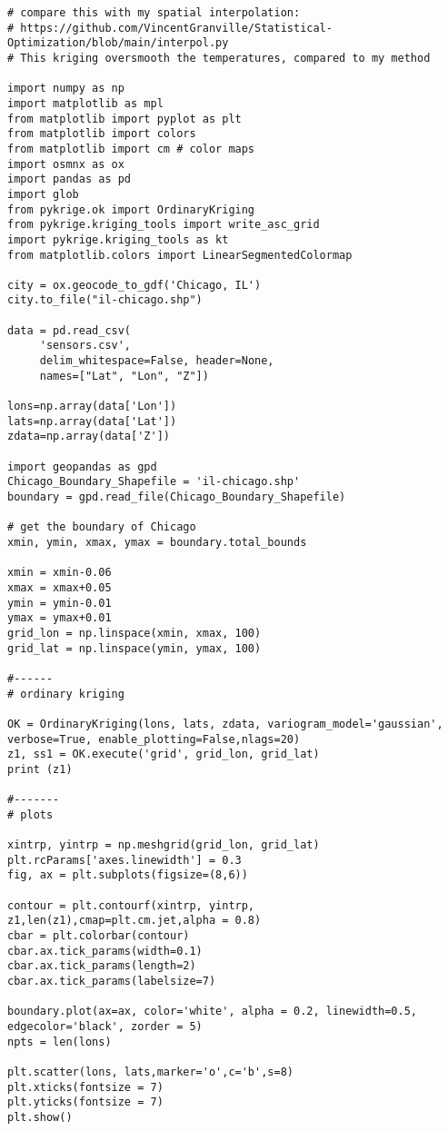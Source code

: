 \documentclass[oneside,10pt]{book}
\begin{document}
\begin{lstlisting}
# compare this with my spatial interpolation: 
# https://github.com/VincentGranville/Statistical-Optimization/blob/main/interpol.py
# This kriging oversmooth the temperatures, compared to my method

import numpy as np
import matplotlib as mpl
from matplotlib import pyplot as plt
from matplotlib import colors  
from matplotlib import cm # color maps
import osmnx as ox
import pandas as pd
import glob
from pykrige.ok import OrdinaryKriging
from pykrige.kriging_tools import write_asc_grid
import pykrige.kriging_tools as kt
from matplotlib.colors import LinearSegmentedColormap

city = ox.geocode_to_gdf('Chicago, IL')
city.to_file("il-chicago.shp")

data = pd.read_csv(
     'sensors.csv',
     delim_whitespace=False, header=None,
     names=["Lat", "Lon", "Z"])

lons=np.array(data['Lon']) 
lats=np.array(data['Lat']) 
zdata=np.array(data['Z'])

import geopandas as gpd
Chicago_Boundary_Shapefile = 'il-chicago.shp'
boundary = gpd.read_file(Chicago_Boundary_Shapefile)

# get the boundary of Chicago 
xmin, ymin, xmax, ymax = boundary.total_bounds

xmin = xmin-0.06
xmax = xmax+0.05
ymin = ymin-0.01
ymax = ymax+0.01
grid_lon = np.linspace(xmin, xmax, 100)
grid_lat = np.linspace(ymin, ymax, 100)

#------
# ordinary kriging

OK = OrdinaryKriging(lons, lats, zdata, variogram_model='gaussian', verbose=True, enable_plotting=False,nlags=20)
z1, ss1 = OK.execute('grid', grid_lon, grid_lat)
print (z1)

#-------
# plots

xintrp, yintrp = np.meshgrid(grid_lon, grid_lat) 
plt.rcParams['axes.linewidth'] = 0.3
fig, ax = plt.subplots(figsize=(8,6))

contour = plt.contourf(xintrp, yintrp, z1,len(z1),cmap=plt.cm.jet,alpha = 0.8)
cbar = plt.colorbar(contour)
cbar.ax.tick_params(width=0.1) 
cbar.ax.tick_params(length=2)
cbar.ax.tick_params(labelsize=7) 

boundary.plot(ax=ax, color='white', alpha = 0.2, linewidth=0.5, edgecolor='black', zorder = 5)
npts = len(lons)

plt.scatter(lons, lats,marker='o',c='b',s=8)  
plt.xticks(fontsize = 7) 
plt.yticks(fontsize = 7)
plt.show()
\end{lstlisting}
\end{document}
